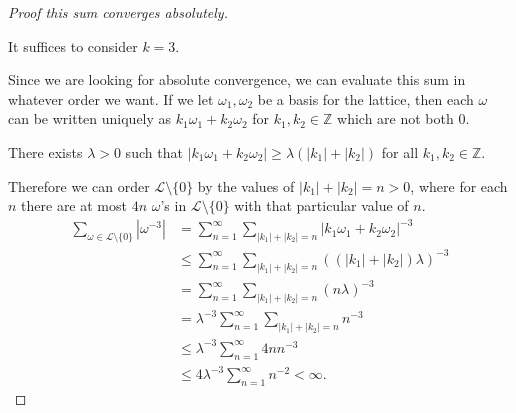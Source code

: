 \documentclass{article}
\theoremstyle{definition}
\theoremstyle{definition}
\theoremstyle{definition}
\begin{document}
\begin{proof}[Proof this sum converges absolutely]\label{minus3converge}

It suffices to consider $k=3$.

Since we are looking for absolute convergence, we can evaluate this sum in whatever order we want. If we let $\omega_1,\omega_2$ be a basis for the lattice, then each $\omega$ can be written uniquely as $k_1\omega_1+k_2\omega_2$ for $k_1,k_2\in\mathbb Z$ which are not both $0$. 

There exists $\lambda>0$ such that $|k_1\omega_1+k_2\omega_2|\geq \lambda(|k_1|+|k_2|)$ for all $k_1,k_2\in\mathbb Z$.

Therefore we can order $\mathcal{L}\setminus \{0\}$ by the values of $|k_1|+|k_2|=n>0$, where for each $n$ there are at most $4n$ $\omega$'s in $\mathcal L\setminus \{0\}$ with that particular value of $n$. 
$$\begin{aligned} 
\sum_{\omega\in\mathcal{L}\setminus \{0\}}|\omega^{-3}|
&=\sum_{n=1}^{\infty}\sum_{|k_1|+|k_2|=n}|k_1\omega_1+k_2\omega_2|^{-3}\\
&\leq\sum_{n=1}^{\infty}\sum_{|k_1|+|k_2|=n}((|k_1|+|k_2|)\lambda)^{-3}\\
&=\sum_{n=1}^{\infty}\sum_{|k_1|+|k_2|=n}(n\lambda)^{-3}\\
&=\lambda^{-3}\sum_{n=1}^{\infty}\sum_{|k_1|+|k_2|=n}n^{-3}\\
&\leq\lambda^{-3}\sum_{n=1}^{\infty}4nn^{-3}\\
&\leq4\lambda^{-3}\sum_{n=1}^{\infty}n^{-2}<\infty.
\end{aligned}$$
\end{proof} 
\end{document}
